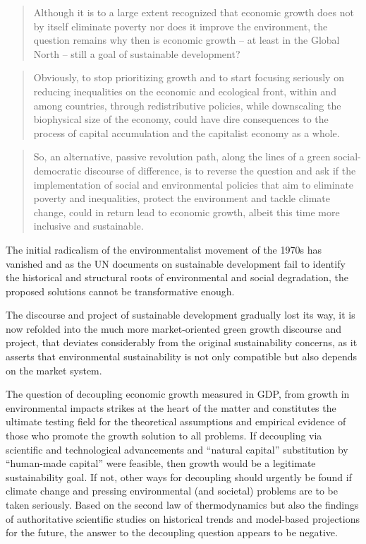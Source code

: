 \documentclass[
]{book}
\begin{document}
\begin{quote}
Although it is to a large extent recognized that economic growth does not by itself eliminate
poverty nor does it improve the environment, the question remains why then is economic growth -- at least in
the Global North -- still a goal of sustainable development?
\end{quote}

\begin{quote}
Obviously, to stop prioritizing growth and to start
focusing seriously on reducing inequalities on the economic and ecological front, within and among countries,
through redistributive policies, while downscaling the biophysical size of the economy, could have dire
consequences to the process of capital accumulation and the capitalist economy as a whole.
\end{quote}

\begin{quote}
So, an alternative,
passive revolution path, along the lines of a green social-democratic discourse of difference, is to reverse the
question and ask if the implementation of social and environmental policies that aim to eliminate poverty and
inequalities, protect the environment and tackle climate change, could in return lead to economic growth, albeit
this time more inclusive and sustainable.
\end{quote}

The initial radicalism of the
environmentalist movement of the 1970s has vanished and as the UN documents on sustainable development
fail to identify the historical and structural roots of environmental and social degradation, the proposed solutions
cannot be transformative enough.

The discourse and project of sustainable development gradually lost its way, it is now
refolded into the much more market-oriented green growth discourse and project, that deviates considerably
from the original sustainability concerns, as it asserts that environmental sustainability is not only compatible
but also depends on the market system.

The question of decoupling economic growth measured in GDP, from growth in environmental impacts
strikes at the heart of the matter and constitutes the ultimate testing field for the theoretical assumptions and
empirical evidence of those who promote the growth solution to all problems. If decoupling via scientific and
technological advancements and ``natural capital'' substitution by ``human-made capital'' were feasible, then
growth would be a legitimate sustainability goal. If not, other ways for decoupling should urgently be found if
climate change and pressing environmental (and societal) problems are to be taken seriously.
Based on the second law of thermodynamics but also the findings of authoritative scientific studies on
historical trends and model-based projections for the future, the answer to the decoupling question appears to
be negative.
\end{document}

